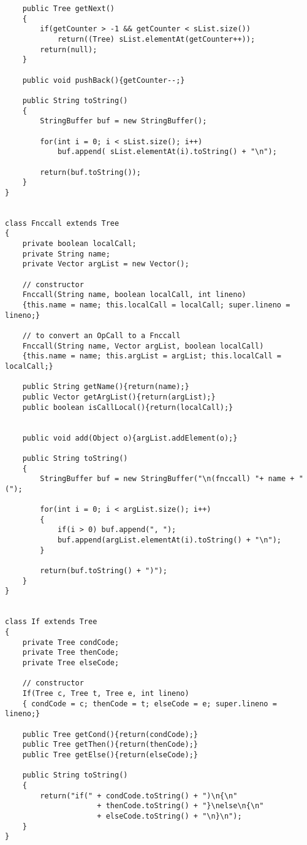 \begin{footnotesize}
\begin{verbatim}
    public Tree getNext()
    {
        if(getCounter > -1 && getCounter < sList.size()) 
            return((Tree) sList.elementAt(getCounter++));
        return(null);
    }
    
    public void pushBack(){getCounter--;}
    
    public String toString()
    {
        StringBuffer buf = new StringBuffer();
        
        for(int i = 0; i < sList.size(); i++)
            buf.append( sList.elementAt(i).toString() + "\n");

        return(buf.toString());
    }
}


class Fnccall extends Tree
{
    private boolean localCall; 
    private String name;
    private Vector argList = new Vector();
    
    // constructor
    Fnccall(String name, boolean localCall, int lineno)
    {this.name = name; this.localCall = localCall; super.lineno = lineno;}
    
    // to convert an OpCall to a Fnccall
    Fnccall(String name, Vector argList, boolean localCall)
    {this.name = name; this.argList = argList; this.localCall = localCall;}

    public String getName(){return(name);}
    public Vector getArgList(){return(argList);}
    public boolean isCallLocal(){return(localCall);}
    
    
    public void add(Object o){argList.addElement(o);}

    public String toString()
    {
        StringBuffer buf = new StringBuffer("\n(fnccall) "+ name + "(");
        
        for(int i = 0; i < argList.size(); i++)
        {    
            if(i > 0) buf.append(", ");
            buf.append(argList.elementAt(i).toString() + "\n");
        }
            
        return(buf.toString() + ")");
    }
}


class If extends Tree
{
    private Tree condCode;
    private Tree thenCode;
    private Tree elseCode;

    // constructor
    If(Tree c, Tree t, Tree e, int lineno)
    { condCode = c; thenCode = t; elseCode = e; super.lineno = lineno;}
    
    public Tree getCond(){return(condCode);}
    public Tree getThen(){return(thenCode);}
    public Tree getElse(){return(elseCode);}
    
    public String toString()
    {
        return("if(" + condCode.toString() + ")\n{\n" 
                     + thenCode.toString() + "}\nelse\n{\n" 
                     + elseCode.toString() + "\n}\n");
    }
}



\end{verbatim}
\end{footnotesize}
